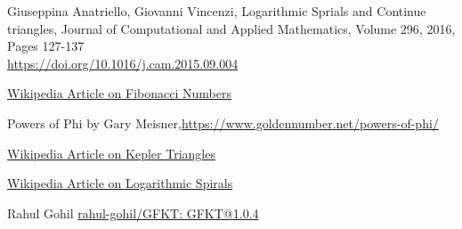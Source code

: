 \documentclass{article}
\begin{document}
\begin{thebibliography}{9}
	
	Giuseppina Anatriello, Giovanni Vincenzi, Logarithmic Sprials and Continue triangles, Journal of Computational and Applied Mathematics, Volume 296, 2016, Pages 127-137\\ \href{https://doi.org/10.1016/j.cam.2015.09.004}{https://doi.org/10.1016/j.cam.2015.09.004}
	
	\href{https://en.wikipedia.org/wiki/Fibonacci_number#Binet's_formula}{Wikipedia Article on Fibonacci Numbers}
	
	
	Powers of Phi by Gary Meisner,\href{https://www.goldennumber.net/powers-of-phi/}{https://www.goldennumber.net/powers-of-phi/}
	
	\href{https://en.wikipedia.org/wiki/Kepler_triangle}{Wikipedia Article on Kepler Triangles}
	
	\href{https://en.wikipedia.org/wiki/Logarithmic_spiral}{Wikipedia Article on Logarithmic Spirals}
	
	Rahul Gohil   \href{https://github.com/rahul-gohil/GFKT/releases/tag/v1.0.4}{rahul-gohil/GFKT: GFKT@1.0.4} 
	
\end{thebibliography}
\end{document}
